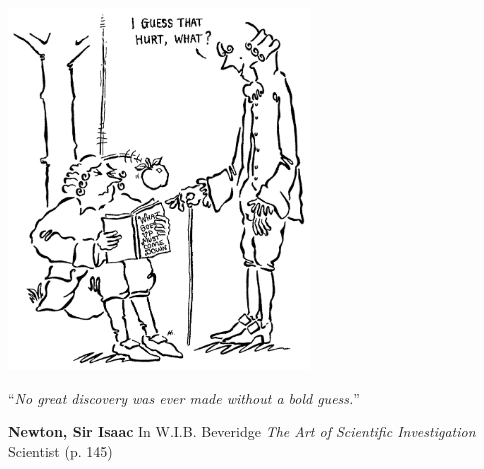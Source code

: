 \documentclass[
11pt, 
oneside,
english,
onehalfspacing,
onehalfspacing,
parskip,
headsepline,
]{MastersDoctoralThesis}
\begin{document}
\begin{center}
\includegraphics[width=0.60\textwidth]{./Figures/quote.png}

\noindent\enquote{\itshape No great discovery was ever made without a bold guess.}\bigbreak
\end{center}

\begin{flushright}
\textbf{Newton, Sir Isaac} \linebreak
In W.I.B. Beveridge \linebreak
\emph{The Art of Scientific Investigation} \linebreak
Scientist (p. 145)
\end{flushright}

\end{document}
